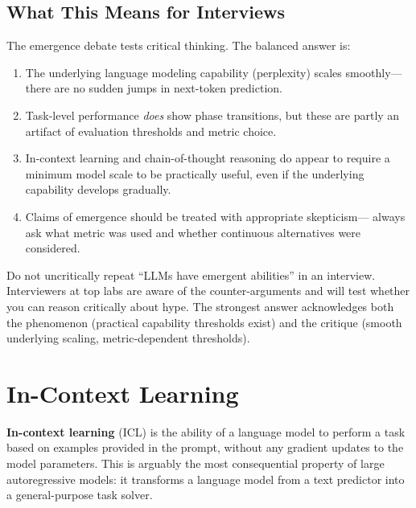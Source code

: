 \subsection{What This Means for Interviews}

The emergence debate tests critical thinking.  The balanced answer is:

\begin{enumerate}[leftmargin=*]
\item The underlying language modeling capability (perplexity) scales
  smoothly---there are no sudden jumps in next-token prediction.
\item Task-level performance \emph{does} show phase transitions, but these
  are partly an artifact of evaluation thresholds and metric choice.
\item In-context learning and chain-of-thought reasoning do appear to require
  a minimum model scale to be practically useful, even if the underlying
  capability develops gradually.
\item Claims of emergence should be treated with appropriate skepticism---
  always ask what metric was used and whether continuous alternatives were
  considered.
\end{enumerate}

\begin{warningbox}
Do not uncritically repeat ``LLMs have emergent abilities'' in an interview.
Interviewers at top labs are aware of the counter-arguments and will test
whether you can reason critically about hype.  The strongest answer
acknowledges both the phenomenon (practical capability thresholds exist) and
the critique (smooth underlying scaling, metric-dependent thresholds).
\end{warningbox}


\section{In-Context Learning}
\label{sec:icl}

\textbf{In-context learning} (ICL) is the ability of a language model to
perform a task based on examples provided in the prompt, without any gradient
updates to the model parameters.  This is arguably the most consequential
property of large autoregressive models: it transforms a language model from a
text predictor into a general-purpose task solver.

